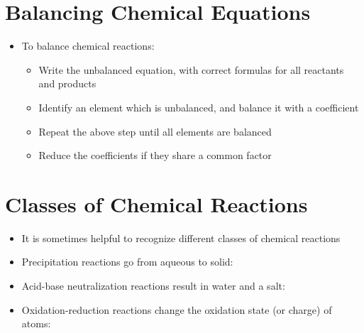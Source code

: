 \documentclass[12pt, openany, letterpaper]{memoir}
\begin{document}
\section{Balancing Chemical Equations}
\begin{itemize}
	\item To balance chemical reactions:
	      \begin{itemize}
		      \item Write the unbalanced equation, with correct formulas for all reactants and products
		      \item Identify an element which is unbalanced, and balance it with a coefficient
		      \item Repeat the above step until all elements are balanced
		      \item Reduce the coefficients if they share a common factor
	      \end{itemize}
\end{itemize}
\section{Classes of Chemical Reactions}
\begin{itemize}
	\item It is sometimes helpful to recognize different classes of chemical reactions
	\item Precipitation reactions go from aqueous to solid:

	\item Acid-base neutralization reactions result in water and a salt:

	\item Oxidation-reduction reactions change the oxidation state (or charge) of atoms:

\end{itemize}
\end{document}
